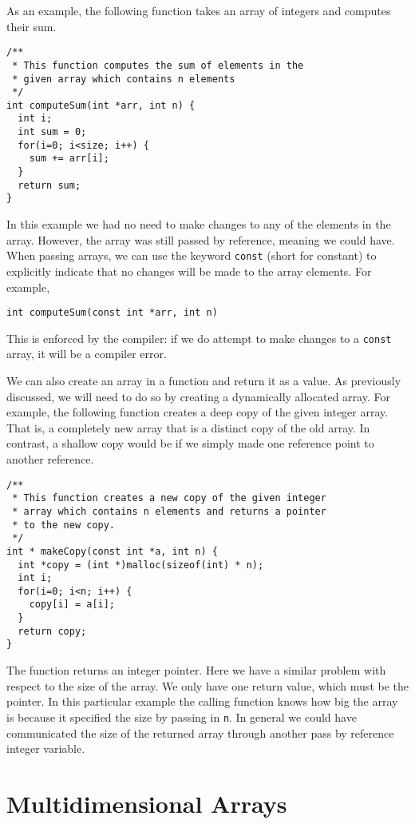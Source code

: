 As an example, the following function takes an array of integers
and computes their sum.

\begin{verbatim}
/**
 * This function computes the sum of elements in the
 * given array which contains n elements
 */
int computeSum(int *arr, int n) {
  int i;
  int sum = 0;
  for(i=0; i<size; i++) {
    sum += arr[i];
  }
  return sum;
}
\end{verbatim}

In this example we had no need to make changes to any of the elements
in the array.  However, the array was still passed by reference, meaning
we could have.  When passing arrays, we can use the keyword 
\texttt{const} (short for constant) to explicitly indicate that no changes will be made to the array elements.  For example, 

\texttt{int computeSum(const int *arr, int n)}

This is enforced by the compiler: if we do attempt
to make changes to a \texttt{const} array, it will be a compiler
error.

We can also create an array in a function and return it as 
a value.  As previously discussed, we will need to do so by 
creating a dynamically allocated array.  For example, the 
following function creates a \gls{deep copy} of the given 
integer array.  That is, a completely new array that is a distinct 
copy of the old array.  In contrast, a \gls{shallow copy}
would be if we simply made one reference point to another 
reference.


\begin{verbatim}
/**
 * This function creates a new copy of the given integer
 * array which contains n elements and returns a pointer
 * to the new copy.
 */
int * makeCopy(const int *a, int n) {
  int *copy = (int *)malloc(sizeof(int) * n);
  int i;
  for(i=0; i<n; i++) {
    copy[i] = a[i];
  }
  return copy;
}
\end{verbatim}

The function returns an integer pointer.  Here we have a similar problem
with respect to the size of the array.  We only have one return value, which
must be the pointer.  In this particular example the calling function knows
how big the array is because it specified the size by passing in \texttt{n}. In general we could have communicated the size of the returned array 
through another pass by reference integer variable.

\section{Multidimensional Arrays}

